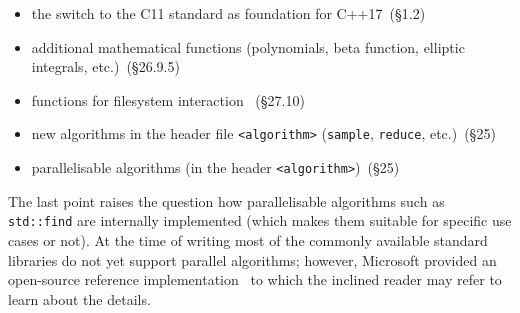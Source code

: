 \begin{itemize}
\item the switch to the C11 standard as foundation for C++17~\cite{cpp17std}(§1.2)
\item additional mathematical functions (polynomials, beta function, elliptic integrals, etc.)~\cite{cpp17std}(§26.9.5)
\item functions for filesystem interaction ~\cite{cpp17std}(§27.10)
\item new algorithms in the header file \texttt{<algorithm>} (\texttt{sample}, \texttt{reduce}, etc.)~\cite{cpp17std}(§25)
\item parallelisable algorithms (in the header \texttt{<algorithm>})~\cite{cpp17std}(§25)
\end{itemize}

\noindent The last point raises the question how parallelisable algorithms such as \texttt{std::find} are internally implemented (which makes them suitable for specific use cases or not). At the time of writing most of the commonly available standard libraries do not yet support parallel algorithms; however, Microsoft provided an open-source reference implementation~\cite{parallel_stl} to which the inclined reader may refer to learn about the details.